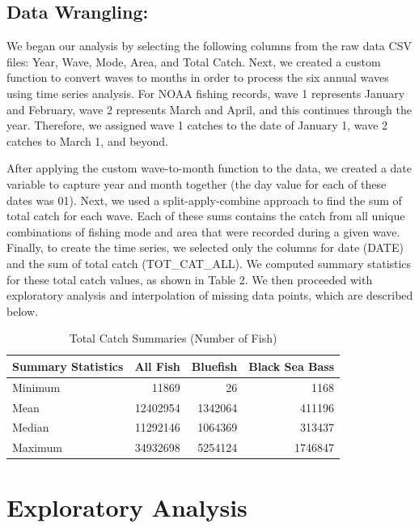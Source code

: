 \documentclass[
  12pt,
]{article}
\begin{document}
\hypertarget{data-wrangling}{%
\subsection{Data Wrangling:}\label{data-wrangling}}

We began our analysis by selecting the following columns from the raw
data CSV files: Year, Wave, Mode, Area, and Total Catch. Next, we
created a custom function to convert waves to months in order to process
the six annual waves using time series analysis. For NOAA fishing
records, wave 1 represents January and February, wave 2 represents March
and April, and this continues through the year. Therefore, we assigned
wave 1 catches to the date of January 1, wave 2 catches to March 1, and
beyond.

After applying the custom wave-to-month function to the data, we created
a date variable to capture year and month together (the day value for
each of these dates was 01). Next, we used a split-apply-combine
approach to find the sum of total catch for each wave. Each of these
sums contains the catch from all unique combinations of fishing mode and
area that were recorded during a given wave. Finally, to create the time
series, we selected only the columns for date (DATE) and the sum of
total catch (TOT\_CAT\_ALL). We computed summary statistics for these
total catch values, as shown in Table 2. We then proceeded with
exploratory analysis and interpolation of missing data points, which are
described below.

\begin{table}[H]

\caption{\label{tab:table2}Total Catch Summaries (Number of Fish)}
\centering
\begin{tabular}[t]{l|r|r|r}
\hline
Summary Statistics & All Fish & Bluefish & Black Sea Bass\\
\hline
Minimum & 11869 & 26 & 1168\\
\hline
Mean & 12402954 & 1342064 & 411196\\
\hline
Median & 11292146 & 1064369 & 313437\\
\hline
Maximum & 34932698 & 5254124 & 1746847\\
\hline
\end{tabular}
\end{table}
\newpage

\hypertarget{exploratory-analysis}{%
\section{Exploratory Analysis}\label{exploratory-analysis}}
\end{document}
